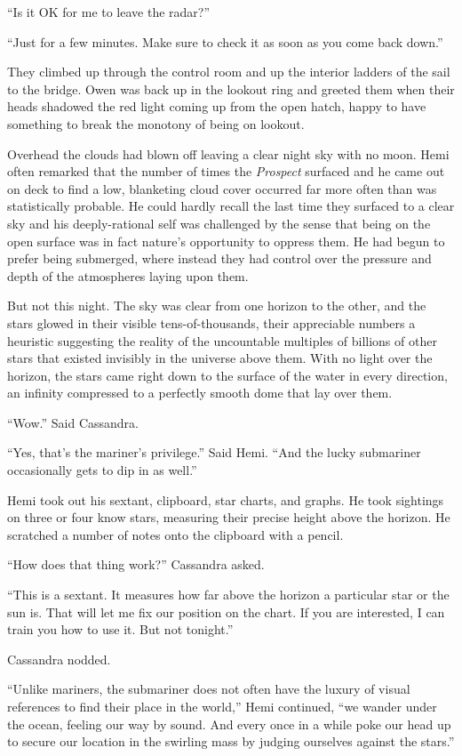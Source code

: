 \documentclass[]{scrbook}
\begin{document}
``Is it OK for me to leave the radar?''

``Just for a few minutes. Make sure to check it as soon as you come back
down.''

They climbed up through the control room and up the interior ladders of
the sail to the bridge. Owen was back up in the lookout ring and greeted
them when their heads shadowed the red light coming up from the open
hatch, happy to have something to break the monotony of being on
lookout.

Overhead the clouds had blown off leaving a clear night sky with no
moon. Hemi often remarked that the number of times the \emph{Prospect}
surfaced and he came out on deck to find a low, blanketing cloud cover
occurred far more often than was statistically probable. He could hardly
recall the last time they surfaced to a clear sky and his
deeply-rational self was challenged by the sense that being on the open
surface was in fact nature's opportunity to oppress them. He had begun
to prefer being submerged, where instead they had control over the
pressure and depth of the atmospheres laying upon them.

But not this night. The sky was clear from one horizon to the other, and
the stars glowed in their visible tens-of-thousands, their appreciable
numbers a heuristic suggesting the reality of the uncountable multiples
of billions of other stars that existed invisibly in the universe above
them. With no light over the horizon, the stars came right down to the
surface of the water in every direction, an infinity compressed to a
perfectly smooth dome that lay over them.

``Wow.'' Said Cassandra.

``Yes, that's the mariner's privilege.'' Said Hemi. ``And the lucky
submariner occasionally gets to dip in as well.''

Hemi took out his sextant, clipboard, star charts, and graphs. He took
sightings on three or four know stars, measuring their precise height
above the horizon. He scratched a number of notes onto the clipboard
with a pencil.

``How does that thing work?'' Cassandra asked.

``This is a sextant. It measures how far above the horizon a particular
star or the sun is. That will let me fix our position on the chart. If
you are interested, I can train you how to use it. But not tonight.''

Cassandra nodded.

``Unlike mariners, the submariner does not often have the luxury of
visual references to find their place in the world,'' Hemi continued,
``we wander under the ocean, feeling our way by sound. And every once in
a while poke our head up to secure our location in the swirling mass by
judging ourselves against the stars.''
\end{document}
